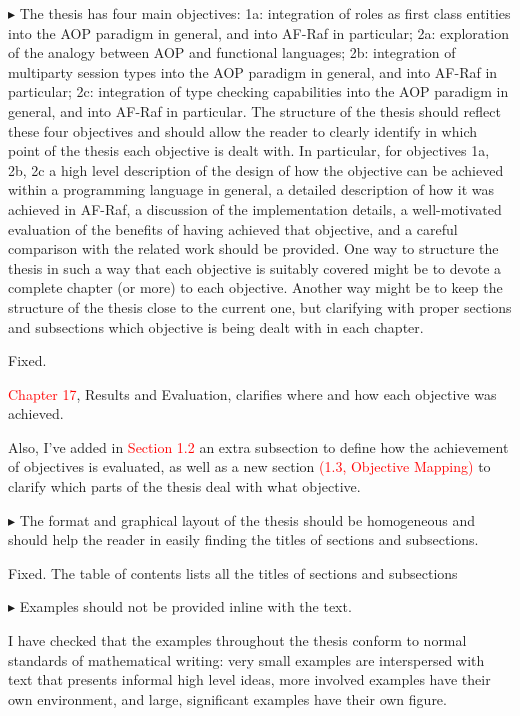 \documentclass{article}
\newcommand*\R[1]{\textcolor{red}{#1}} %
\newenvironment{them}%
  {\bigskip\noindent\begingroup\color{blue}$\blacktriangleright$\enspace}%
  {\endgroup\par}
\begin{document}
\begin{them}
The thesis has four main objectives: 1a: integration of roles as first class
entities into the AOP paradigm in general, and into AF-Raf in particular; 2a:
exploration of the analogy between AOP and functional languages; 2b:
integration of multiparty session types into the AOP paradigm in general, and
into AF-Raf in particular; 2c: integration of type checking capabilities into
the AOP paradigm in general, and into AF-Raf in particular.  The structure of
the thesis should reflect these four objectives and should allow the reader to
clearly identify in which point of the thesis each objective is dealt with. In
particular, for objectives 1a, 2b, 2c a high level description of the design of
how the objective can be achieved within a programming language in general, a
detailed description of how it was achieved in AF-Raf, a discussion of the
implementation details, a well-motivated evaluation of the benefits of having
achieved that objective, and a careful comparison with the related work should
be provided.  One way to structure the thesis in such a way that each objective
is suitably covered might be to devote a complete chapter (or more) to each
objective. Another way might be to keep the structure of the thesis close to
the current one, but clarifying with proper sections and subsections which
objective is being dealt with in each chapter.
\end{them}
Fixed. 

\R{Chapter 17}, Results and Evaluation, clarifies where and how each objective
was achieved.

Also, I've added in \R{Section 1.2} an extra subsection to define how the
achievement of objectives is evaluated, as well as a new  section \R{(1.3,
Objective Mapping)} to clarify which parts of the thesis deal with what
objective.

\begin{them}
The format and graphical layout of the thesis should be homogeneous and should
help the reader in easily finding the titles of sections and subsections.
\end{them}
Fixed. The table of contents lists all the titles of sections and subsections

\begin{them}
Examples should not be provided inline with the text.
\end{them}

I have checked that the examples throughout the thesis conform to normal
standards of mathematical writing: very small examples are interspersed with
text that presents informal high level ideas, more involved examples have their
own environment, and large, significant examples have their own figure.
\end{document}
